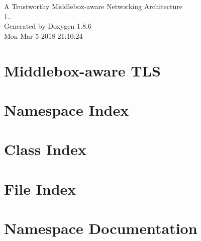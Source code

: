 \documentclass[twoside]{book}
\newcommand{\clearemptydoublepage}{%
  \newpage{\pagestyle{empty}\cleardoublepage}%
}
\begin{document}
\hypersetup{pageanchor=false}
\begin{titlepage}
\vspace*{7cm}
\begin{center}%
{\Large A Trustworthy Middlebox-\/aware Networking Architecture \\[1ex]\large 1.. }\\
\vspace*{1cm}
{\large Generated by Doxygen 1.8.6}\\
\vspace*{0.5cm}
{\small Mon Mar 5 2018 21:10:24}\\
\end{center}
\end{titlepage}
\clearemptydoublepage
\tableofcontents
\clearemptydoublepage
{}
\hypersetup{pageanchor=true}

\chapter{Middlebox-\/aware T\-L\-S}
\label{md_README}
\hypertarget{md_README}{}

\chapter{Namespace Index}

\chapter{Class Index}

\chapter{File Index}

\chapter{Namespace Documentation}




















\end{document}
